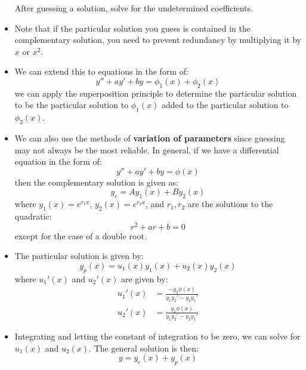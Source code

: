 \documentclass{article}
\let\oldtextbf\textbf
\renewcommand{\textbf}[1]{\oldtextbf{#1}\index{#1}}
\begin{document}
\begin{itemize}
\begin{itemize}
\begin{equation}
        \end{equation}
    \end{itemize}
    After guessing a solution, solve for the undetermined coefficients.
    \item Note that if the particular solution you guess is contained in the complementary solution, you need to prevent redundancy by multiplying it by $x$ or $x^2$.
    \item We can extend this to equations in the form of:
    \begin{equation}
        y''+ay'+by = \phi_1(x)+\phi_2(x)
        \label{eq:}
    \end{equation}
    we can apply the superposition principle to determine the particular solution to be the particular solution to $\phi_1(x)$ added to the particular solution to $\phi_2(x)$.
    \item We can also use the methods of \textbf{variation of parameters} since guessing may not always be the most reliable. In general, if we have a differential equation in the form of:
        \begin{equation}
            y''+ay'+by = \phi(x)
            \label{eq:}
        \end{equation}
        then the complementary solution is given as:
        \begin{equation}
            y_c = Ay_1(x)+By_2(x)
            \label{eq:}
        \end{equation}
        where $y_1(x)=e^{r_1x}$, $y_2(x)=e^{r_2x}$, and $r_1, r_2$ are the solutions to the quadratic:
        \begin{equation}
            r^2+ar+b=0
            \label{eq:}
        \end{equation}
        except for the case of a double root.
    \item The particular solution is given by:
        \begin{equation}
            y_p(x) = u_1(x)y_1(x)+u_2(x)y_2(x)
            \label{eq:}
        \end{equation}
        where $u_1'(x)$ and $u_2'(x)$ are given by:
        \begin{align}
            u_1'(x) &= \frac{-y_2\phi(x)}{y_1y_2'-y_2y_1'} \\ 
            u_2'(x) &= \frac{y_1\phi(x)}{y_1y_2'-y_2y_1'}
        \end{align}
    \item Integrating and letting the constant of integration to be zero, we can solve for $u_1(x)$ and $u_2(x)$. The general solution is then:
        \begin{equation}
            y = y_c(x) + y_p(x)
            \label{eq:}
        \end{equation}
\end{itemize}
\end{document}
